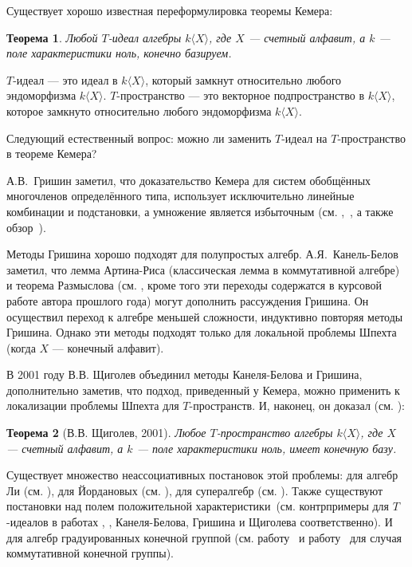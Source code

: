 \documentclass[12pt,a4paper]{article}
\newtheorem*{theorem*}{Теорема}
\begin{document}
    Существует хорошо известная переформулировка теоремы Кемера:

    \vskip 0.1in\noindent
    \begin{theorem*}
        Любой $T$-идеал алгебры $k\langle X\rangle$, где $X$ — счетный алфавит, а $k$ — поле характеристики ноль, конечно базируем.
    \end{theorem*}
    \vskip 0.1in\noindent

    $T$-идеал — это идеал в $k\langle X\rangle$, который замкнут относительно любого эндоморфизма $k\langle X\rangle$.
    $T$-пространство — это векторное подпространство в $k\langle X\rangle$, которое замкнуто относительно любого эндоморфизма $k\langle X\rangle$.

    Следующий естественный вопрос: можно ли заменить $T$-идеал на $T$-пространство в теореме Кемера?

    А.В.\ Гришин заметил, что доказательство Кемера для систем обобщённых многочленов определённого типа, использует исключительно линейные комбинации и подстановки, а умножение является избыточным (см. \cite{Grishin},~\cite{Grishin2}, а также обзор~\cite{GrishinSchigolev}).

    Методы Гришина хорошо подходят для полупростых алгебр.
    А.Я.\ Канель-Белов заметил, что лемма Артина-Риса (классическая лемма в коммутативной алгебре) и теорема Размыслова (см. \cite{GrishinSchigolev},  кроме того эти переходы содержатся в курсовой работе автора прошлого года) могут дополнить рассуждения Гришина.
    Он осуществил переход к алгебре меньшей сложности, индуктивно повторяя методы Гришина.
    Однако эти методы подходят только для локальной проблемы Шпехта (когда $X$ — конечный алфавит).

    В 2001 году В.В. Щиголев объединил методы Канеля-Белова и Гришина, дополнительно заметив, что подход, приведенный у Кемера, можно применить к локализации проблемы Шпехта для $T$-пространств.
    И, наконец, он доказал (см. \cite{Shchigolev}):
    \vskip 0.1in\noindent
    \begin{theorem*} [В.В. Щиголев, 2001]
        Любое $T$-пространство алгебры $k\langle X\rangle$, где $X$ — счетный алфавит, а $k$ — поле характеристики ноль, имеет конечную базу.
    \end{theorem*}
    \vskip 0.1in\noindent

    Существует множество неассоциативных постановок этой проблемы: для алгебр Ли (см. \cite{Lie}), для Йордановых (см. \cite{Jordan}), для супералгебр (см. \cite{Super}).
    Также существуют постановки над полем положительной характеристики\ (см. контрпримеры для $T$-идеалов в работах \cite{ConterKanel}, \cite{ConterGrishin}, \cite{ConterShchigolev} Канеля-Белова, Гришина и Щиголева соответственно).
    И для алгебр градуированных конечной группой (см. работу~\cite{GradedKanel} и работу~\cite{GradedSviridova} для случая коммутативной конечной группы).
\end{document}

